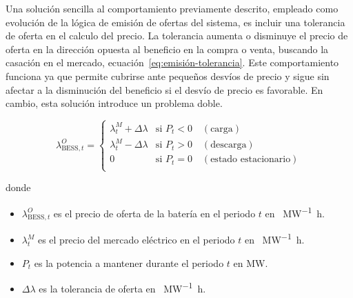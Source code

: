 Una solución sencilla al comportamiento previamente descrito, empleado como evolución de la lógica de emisión de ofertas del sistema, es incluir una tolerancia de oferta en el calculo del precio. La tolerancia aumenta o disminuye el precio de oferta en la dirección opuesta al beneficio en la compra o venta, buscando la casación en el mercado, ecuación~\ref{eq:emisión-tolerancia}. Este comportamiento funciona ya que permite cubrirse ante pequeños desvíos de precio y sigue sin afectar a la disminución del beneficio si el desvío de precio es favorable. En cambio, esta solución introduce un problema doble.

\begin{samepage}

  \begin{equation}
    \label{eq:emisión-tolerancia}
    \lambda^{O}_{\text{BESS}, t} =
    \begin{cases}
      \lambda^{M}_{t} + \Delta \lambda & \text{si } P_{t} < 0 \quad (\text{carga})       \\
      \lambda^{M}_{t} - \Delta \lambda & \text{si } P_{t} > 0 \quad (\text{descarga})    \\
      0                                & \text{si } P_{t} = 0 \quad (\text{estado estacionario}) \\
    \end{cases}
  \end{equation}

  donde

  \begin{itemize}

    \item \( \lambda^{O}_{\text{BESS}, t} \) es el precio de oferta de la batería en el periodo \( t \) en \si{\text{\euro}\per\mega\watt\hour}.

    \item \( \lambda^{M}_{t} \) es el precio del mercado eléctrico en el periodo \( t \) en \si{\text{\euro}\per\mega\watt\hour}.

    \item \( P_{t} \) es la potencia a mantener durante el periodo \( t \) en \si{\mega\watt}.

    \item \( \Delta \lambda \) es la tolerancia de oferta en \si{\text{\euro}\per\mega\watt\hour}.

  \end{itemize}

\end{samepage}

